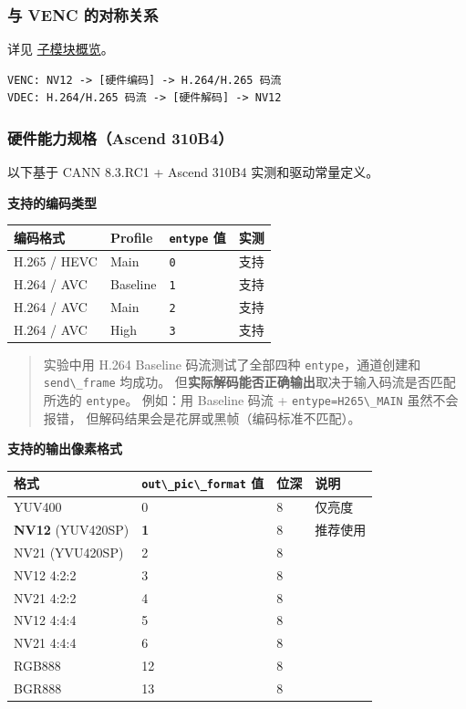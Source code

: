 \subsubsection{与 VENC 的对称关系}\label{src-book-chapter6-h53}

详见 \hyperref[dvpp-modules]{子模块概览}。

\begin{lstlisting}
VENC: NV12 -> [硬件编码] -> H.264/H.265 码流
VDEC: H.264/H.265 码流 -> [硬件解码] -> NV12
\end{lstlisting}

\subsubsection{硬件能力规格（Ascend
310B4）}\label{src-book-chapter6-h54}

以下基于 CANN 8.3.RC1 + Ascend 310B4 实测和驱动常量定义。

\textbf{支持的编码类型}

\begin{longtable}[]{@{}llll@{}}
\toprule\noalign{}
编码格式 & Profile & \passthrough{\lstinline!entype!} 值 & 实测 \\
\midrule\noalign{}
\endhead
\bottomrule\noalign{}
\endlastfoot
H.265 / HEVC & Main & \passthrough{\lstinline!0!} & 支持 \\
H.264 / AVC & Baseline & \passthrough{\lstinline!1!} & 支持 \\
H.264 / AVC & Main & \passthrough{\lstinline!2!} & 支持 \\
H.264 / AVC & High & \passthrough{\lstinline!3!} & 支持 \\
\end{longtable}

\begin{quote}
实验中用 H.264 Baseline 码流测试了全部四种
\passthrough{\lstinline!entype!}，通道创建和
\passthrough{\lstinline!send\_frame!} 均成功。
但\textbf{实际解码能否正确输出}取决于输入码流是否匹配所选的
\passthrough{\lstinline!entype!}。 例如：用 Baseline 码流 +
\passthrough{\lstinline!entype=H265\_MAIN!} 虽然不会报错，
但解码结果会是花屏或黑帧（编码标准不匹配）。
\end{quote}

\textbf{支持的输出像素格式}

\begin{longtable}[]{@{}llll@{}}
\toprule\noalign{}
格式 & \passthrough{\lstinline!out\_pic\_format!} 值 & 位深 & 说明 \\
\midrule\noalign{}
\endhead
\bottomrule\noalign{}
\endlastfoot
YUV400 & 0 & 8 & 仅亮度 \\
\textbf{NV12} (YUV420SP) & \textbf{1} & 8 & 推荐使用 \\
NV21 (YVU420SP) & 2 & 8 & \\
NV12 4:2:2 & 3 & 8 & \\
NV21 4:2:2 & 4 & 8 & \\
NV12 4:4:4 & 5 & 8 & \\
NV21 4:4:4 & 6 & 8 & \\
RGB888 & 12 & 8 & \\
BGR888 & 13 & 8 & \\
\end{longtable}


